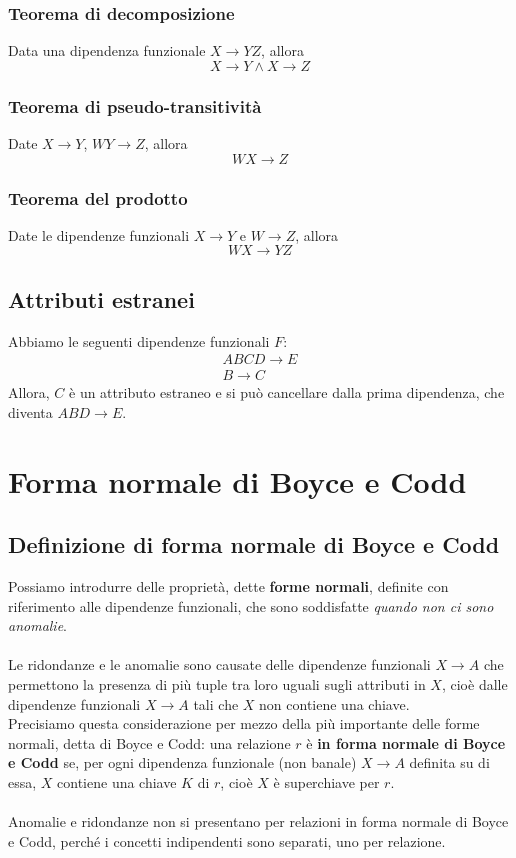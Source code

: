 \subsubsection{Teorema di decomposizione}
Data una dipendenza funzionale $X \rightarrow YZ$, allora
    $$X \rightarrow Y \wedge X \rightarrow Z$$

\subsubsection{Teorema di pseudo-transitività}
Date $X \rightarrow Y$, $WY \rightarrow Z$, allora 
    $$WX \rightarrow Z$$

\subsubsection{Teorema del prodotto}
Date le dipendenze funzionali $X \rightarrow Y$ e $W \rightarrow Z$, allora 
    $$WX \rightarrow YZ$$

\subsection{Attributi estranei}
Abbiamo le seguenti dipendenze funzionali $F$:
    \begin{equation}\begin{aligned}
        ABCD \rightarrow E\\
        B \rightarrow C
    \end{aligned}\end{equation}
Allora, $C$ è un attributo estraneo e si può cancellare dalla prima dipendenza, che diventa $ABD \rightarrow E$.


\section{Forma normale di Boyce e Codd}
\subsection{Definizione di forma normale di Boyce e Codd}
Possiamo introdurre delle proprietà, dette \textbf{forme normali}, definite con riferimento alle dipendenze funzionali, che sono soddisfatte \textit{quando non ci sono anomalie}.\\\\
Le ridondanze e le anomalie sono causate delle dipendenze funzionali $X \rightarrow A$ che permettono la presenza di più tuple tra loro uguali sugli attributi in $X$, cioè dalle dipendenze funzionali $X \rightarrow A$ tali che $X$ non contiene una chiave.\\
Precisiamo questa considerazione per mezzo della più importante delle forme normali, detta di Boyce e Codd: una relazione $r$ è \textbf{in forma normale di Boyce e Codd} se, per ogni dipendenza funzionale (non banale) $X \rightarrow A$ definita su di essa, $X$ contiene una chiave $K$ di $r$, cioè $X$ è superchiave per $r$.\\\\
Anomalie e ridondanze non si presentano per relazioni in forma normale di Boyce e Codd, perché i concetti indipendenti sono separati, uno per relazione.

